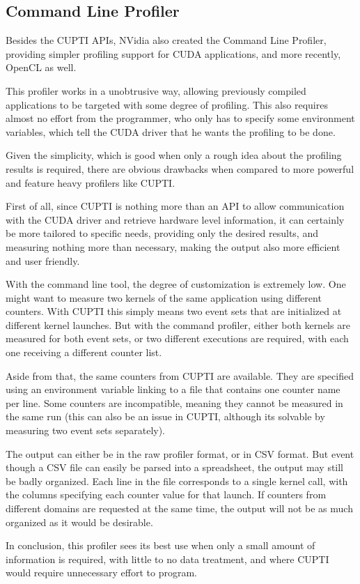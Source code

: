 \subsection{Command Line Profiler}
\label{sec:330}

Besides the CUPTI APIs, NVidia also created the Command Line Profiler, providing simpler profiling support for CUDA applications, and more recently, OpenCL as well.

This profiler works in a unobtrusive way, allowing previously compiled applications to be targeted with some degree of profiling. This also requires almost no effort from the programmer, who only has to specify some environment variables, which tell the CUDA driver that he wants the profiling to be done.

Given the simplicity, which is good when only a rough idea about the profiling results is required, there are obvious drawbacks when compared to more powerful and feature heavy profilers like CUPTI.

First of all, since CUPTI is nothing more than an API to allow communication with the CUDA driver and retrieve hardware level information, it can certainly be more tailored to specific needs, providing only the desired results, and measuring nothing more than necessary, making the output also more efficient and user friendly.

With the command line tool, the degree of customization is extremely low. One might want to measure two kernels of the same application using different counters. With CUPTI this simply means two event sets that are initialized at different kernel launches. But with the command profiler, either both kernels are measured for both event sets, or two different executions are required, with each one receiving a different counter list.

Aside from that, the same counters from CUPTI are available. They are specified using an environment variable linking to a file that contains one counter name per line. Some counters are incompatible, meaning they cannot be measured in the same run (this can also be an issue in CUPTI, although its solvable by measuring two event sets separately).

The output can either be in the raw profiler format, or in CSV format. But event though a CSV file can easily be parsed into a spreadsheet, the output may still be badly organized. Each line in the file corresponds to a single kernel call, with the columns specifying each counter value for that launch. If counters from different domains are requested at the same time, the output will not be as much organized as it would be desirable.

In conclusion, this profiler sees its best use when only a small amount of information is required, with little to no data treatment, and where CUPTI would require unnecessary effort to program.